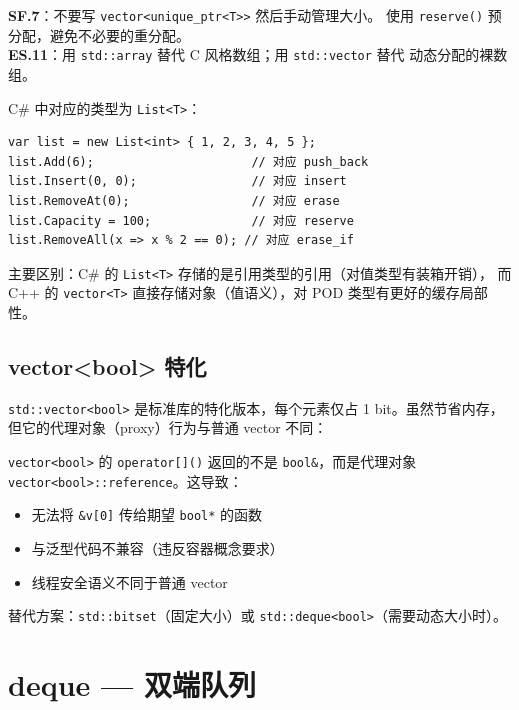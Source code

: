 \documentclass[12pt,a4paper,fontset=fandol]{ctexbook}
\newcommand{\Fn}[1]{\texttt{#1()}}
\newcommand{\Tp}[1]{\texttt{#1}}
\begin{document}
\begin{guideline}
\textbf{SF.7}：不要写 \texttt{vector<unique\_ptr<T>>} 然后手动管理大小。
使用 \Fn{reserve} 预分配，避免不必要的重分配。\\
\textbf{ES.11}：用 \texttt{std::array} 替代 C 风格数组；用 \texttt{std::vector} 替代
动态分配的裸数组。
\end{guideline}

\begin{compare}
C\# 中对应的类型为 \texttt{List<T>}：
\begin{lstlisting}[style=csharpstyle]
var list = new List<int> { 1, 2, 3, 4, 5 };
list.Add(6);                      // 对应 push_back
list.Insert(0, 0);                // 对应 insert
list.RemoveAt(0);                 // 对应 erase
list.Capacity = 100;              // 对应 reserve
list.RemoveAll(x => x % 2 == 0); // 对应 erase_if
\end{lstlisting}

主要区别：C\# 的 \texttt{List<T>} 存储的是引用类型的引用（对值类型有装箱开销），
而 C++ 的 \texttt{vector<T>} 直接存储对象（值语义），对 POD 类型有更好的缓存局部性。
\end{compare}

\section{vector<bool> 特化}

\Tp{std::vector<bool>} 是标准库的特化版本，每个元素仅占 1 bit。虽然节省内存，
但它的代理对象（proxy）行为与普通 vector 不同：

\begin{warning}
\texttt{vector<bool>} 的 \Fn{operator[]} 返回的不是 \texttt{bool\&}，而是代理对象
\texttt{vector<bool>::\allowbreak{}reference}。这导致：
\begin{itemize}
\item 无法将 \texttt{\&v[0]} 传给期望 \texttt{bool*} 的函数
\item 与泛型代码不兼容（违反容器概念要求）
\item 线程安全语义不同于普通 vector
\end{itemize}
替代方案：\texttt{std::bitset}（固定大小）或 \texttt{std::deque<bool>}（需要动态大小时）。
\end{warning}

\chapter{deque --- 双端队列}
\end{document}
